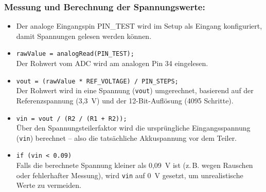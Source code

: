 \documentclass[ngerman,12pt,a4paper]{article}
\begin{document}
	 	\subsubsection*{Messung und Berechnung der Spannungswerte:}
	 	
	 	\begin{itemize}
	 		\item Der analoge Eingangspin PIN\_TEST wird im Setup als Eingang konfiguriert, damit Spannungen gelesen werden können.
	 	
	 		\item \texttt{rawValue = analogRead(PIN\_TEST);} \\
	 		Der Rohwert vom ADC wird am analogen Pin 34 eingelesen.
	 		
	 		\item \texttt{vout = (rawValue * REF\_VOLTAGE) / PIN\_STEPS;} \\
	 		Der Rohwert wird in eine Spannung (\texttt{vout}) umgerechnet, basierend auf der Referenzspannung (3{,}3~V) und der 12-Bit-Auflösung (4095 Schritte).
	 		
	 		\item \texttt{vin = vout / (R2 / (R1 + R2));} \\
	 		Über den Spannungsteilerfaktor wird die ursprüngliche Eingangsspannung (\texttt{vin}) berechnet – also die tatsächliche Akkuspannung vor dem Teiler.
	 		
	 		\item \texttt{if (vin < 0.09)} \\
	 		Falls die berechnete Spannung kleiner als 0{,}09~V ist (z.\,B. wegen Rauschen oder fehlerhafter Messung), wird \texttt{vin} auf 0~V gesetzt, um unrealistische Werte zu vermeiden.
	 	\end{itemize}
	 	
\end{document}
